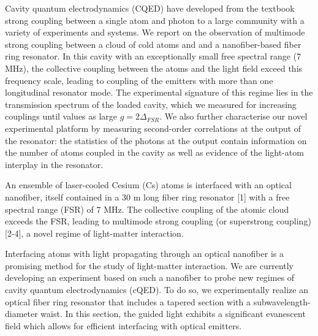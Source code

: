 \documentclass{scdpg}
\begin{document}
\begin{scAbstract}
{}
\scBeginText
Cavity quantum electrodynamics (CQED) have developed from the textbook strong coupling between a single atom and photon to a large community with a variety of experiments and systems. 
We report on the observation of multimode strong coupling between a cloud of cold atoms and and a nanofiber-based fiber ring resonator. In this cavity with an exceptionally small free spectral range (7 MHz), the collective coupling between the atoms and the light field exceed this frequency scale, leading to coupling of the emitters with more than one longitudinal resonator mode. The experimental signature of this regime lies in the transmission spectrum of the loaded cavity, which we measured for increasing couplings until values as large $g = 2 \Delta_{FSR}$. We also further characterise our novel experimental platform by measuring second-order correlations at the output of the resonator: the statistics of the photons at the output contain information on the number of atoms coupled in the cavity as well as evidence of the light-atom interplay in the resonator.

An ensemble of laser-cooled Cesium (Cs) atoms is interfaced with an optical nanofiber,
itself contained in a 30 m long fiber ring resonator [1] with a free spectral range (FSR) of 7
MHz. The collective coupling of the atomic cloud exceeds the FSR, leading to multimode
strong coupling (or superstrong coupling) [2-4], a novel regime of light-matter interaction.

Interfacing atoms with light propagating through an optical nanofiber is a promising method for the study of light-matter interaction. We are currently developing an experiment based on such a nanofiber to probe new regimes of cavity quantum electrodynamics (cQED).
To do so, we experimentally realize an optical fiber ring resonator that includes a tapered section with a subwavelength-diameter waist. In this section, the guided light exhibits a significant evanescent field which allows for efficient interfacing with optical emitters.



\end{scAbstract}
\end{document}

